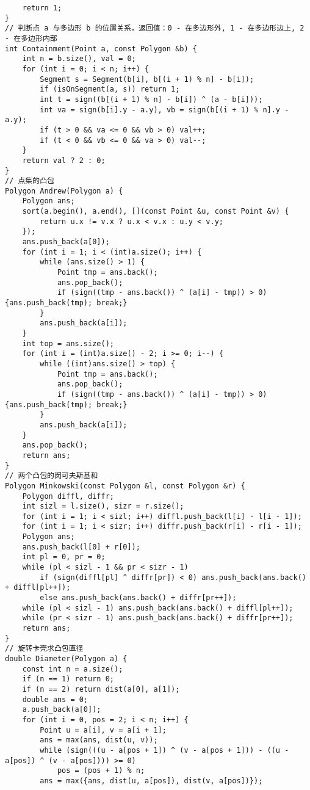 \begin{verbatim}
    return 1;
}
// 判断点 a 与多边形 b 的位置关系，返回值：0 - 在多边形外, 1 - 在多边形边上, 2 - 在多边形内部
int Containment(Point a, const Polygon &b) {
    int n = b.size(), val = 0;
    for (int i = 0; i < n; i++) {
        Segment s = Segment(b[i], b[(i + 1) % n] - b[i]);
        if (isOnSegment(a, s)) return 1;
        int t = sign((b[(i + 1) % n] - b[i]) ^ (a - b[i]));
        int va = sign(b[i].y - a.y), vb = sign(b[(i + 1) % n].y - a.y);
        if (t > 0 && va <= 0 && vb > 0) val++;
        if (t < 0 && vb <= 0 && va > 0) val--;
    }
    return val ? 2 : 0;
}
// 点集的凸包
Polygon Andrew(Polygon a) {
    Polygon ans;
    sort(a.begin(), a.end(), [](const Point &u, const Point &v) {
        return u.x != v.x ? u.x < v.x : u.y < v.y;
    });
    ans.push_back(a[0]);
    for (int i = 1; i < (int)a.size(); i++) {
        while (ans.size() > 1) {
            Point tmp = ans.back();
            ans.pop_back();
            if (sign((tmp - ans.back()) ^ (a[i] - tmp)) > 0) {ans.push_back(tmp); break;}
        }
        ans.push_back(a[i]);
    }
    int top = ans.size();
    for (int i = (int)a.size() - 2; i >= 0; i--) {
        while ((int)ans.size() > top) {
            Point tmp = ans.back();
            ans.pop_back();
            if (sign((tmp - ans.back()) ^ (a[i] - tmp)) > 0) {ans.push_back(tmp); break;}
        }
        ans.push_back(a[i]);
    }
    ans.pop_back();
    return ans;
}
// 两个凸包的闵可夫斯基和
Polygon Minkowski(const Polygon &l, const Polygon &r) {
    Polygon diffl, diffr;
    int sizl = l.size(), sizr = r.size();
    for (int i = 1; i < sizl; i++) diffl.push_back(l[i] - l[i - 1]);
    for (int i = 1; i < sizr; i++) diffr.push_back(r[i] - r[i - 1]);
    Polygon ans;
    ans.push_back(l[0] + r[0]);
    int pl = 0, pr = 0;
    while (pl < sizl - 1 && pr < sizr - 1)
        if (sign(diffl[pl] ^ diffr[pr]) < 0) ans.push_back(ans.back() + diffl[pl++]);
        else ans.push_back(ans.back() + diffr[pr++]);
    while (pl < sizl - 1) ans.push_back(ans.back() + diffl[pl++]);
    while (pr < sizr - 1) ans.push_back(ans.back() + diffr[pr++]);
    return ans;
}
// 旋转卡壳求凸包直径
double Diameter(Polygon a) {
    const int n = a.size();
    if (n == 1) return 0;
    if (n == 2) return dist(a[0], a[1]);
    double ans = 0;
    a.push_back(a[0]);
    for (int i = 0, pos = 2; i < n; i++) {
        Point u = a[i], v = a[i + 1];
        ans = max(ans, dist(u, v));
        while (sign(((u - a[pos + 1]) ^ (v - a[pos + 1])) - ((u - a[pos]) ^ (v - a[pos]))) >= 0)
            pos = (pos + 1) % n;
        ans = max({ans, dist(u, a[pos]), dist(v, a[pos])});

\end{verbatim}
